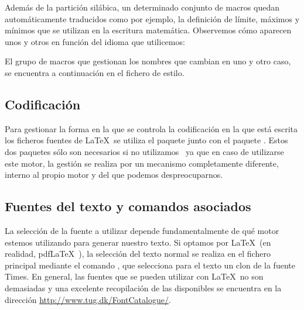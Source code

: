 Además de la partición silábica, un determinado conjunto de macros quedan automáticamente traducidos como por ejemplo, la definición de límite, máximos y mínimos que se utilizan en la escritura matemática. Observemos cómo aparecen unos y otros en función del idioma que utilicemos:


El grupo de macros que gestionan los nombres que cambian en uno y otro caso, se encuentra a continuación en el fichero de estilo. 
\subsection{Codificación}
Para gestionar la forma en la que se controla la codificación en la que está escrita los ficheros fuentes de \LaTeX\ se utiliza el paquete  junto con el paquete . Estos dos paquetes sólo son necesarios si no utilizamos \LuaLaTeX\ ya que en caso de utilizarse este motor, la gestión se realiza por un mecanismo completamente diferente, interno al propio motor y del que podemos despreocuparnos. 

\subsection{Fuentes del texto y comandos asociados}
La selección de la fuente a utilizar depende fundamentalmente de qué motor estemos utilizando para generar nuestro texto. Si optamos por \LaTeX\ (en realidad, pdf\LaTeX\ ), la selección del texto normal se realiza en el fichero principal mediante el comando , que selecciona para el texto un clon de la fuente Times. En general, las fuentes que se pueden utilizar con \LaTeX\ no son demasiadas y una excelente recopilación de las disponibles se encuentra en la dirección \url{http://www.tug.dk/FontCatalogue/}. 

